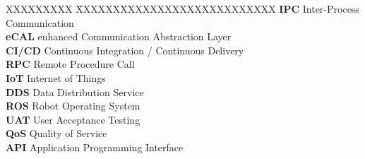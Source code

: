 \documentclass[a4paper,12pt,singlespacing]{article}
\begin{document}
\begin{tabbing}
	XXXXXXXXX \= XXXXXXXXXXXXXXXXXXXXXXXXXXX \kill %
	\textbf{IPC} \> Inter-Process Communication\\[0.5cm]
	\textbf{eCAL} \> enhanced Communication Abstraction Layer\\[0.5cm]
	\textbf{CI/CD} \> Continuous Integration / Continuous Delivery\\[0.5cm]
	\textbf{RPC} \> Remote Procedure Call\\[0.5cm]
	\textbf{IoT} \> Internet of Things\\[0.5cm]
	\textbf{DDS} \> Data Distribution Service\\[0.5cm]
	\textbf{ROS} \> Robot Operating System\\[0.5cm]
	\textbf{UAT} \> User Acceptance Testing\\[0.5cm]
	\textbf{QoS} \> Quality of Service\\[0.5cm]
	\textbf{API} \> Application Programming Interface\\[0.5cm]
\end{tabbing}

\pagebreak
{}
\pagestyle{scrheadings}






\printbibliography[heading=bibintoc]
\end{document}
